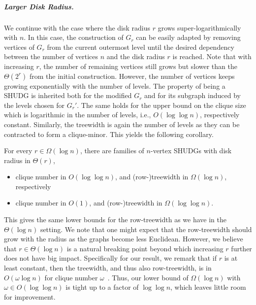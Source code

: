 \documentclass[a4paper,english,cleveref,thm-restate]{lipics-v2021}
\begin{document}
\subparagraph{Larger Disk Radius.}

We continue with the case where the disk radius $r$ grows super-logarithmically with $n$.
In this case, the construction of $G_r$ can be easily adapted by removing vertices of $G_r$ from the current outermost level until the desired dependency between the number of vertices $n$ and the disk radius $r$ is reached.
Note that with increasing $ r $, the number of remaining vertices still grows but slower than the $ \Theta(2^r) $ from the initial construction.
However, the number of vertices keeps growing exponentially with the number of levels.
The property of being a SHUDG is inherited both for the modified $ G_r $ and for its subgraph induced by the levels chosen for $ G_r' $.
The same holds for the upper bound on the clique size which is logarithmic in the number of levels, i.e., $ O(\log \log n) $, respectively constant.
Similarly, the treewidth is again the number of levels as they can be contracted to form a clique-minor.
This yields the following corollary.

\begin{corollary}
    \label{cor:lower-bound-super-log-radius}
    For every $r \in \Omega(\log n)$, there are families of $n$-vertex SHUDGs with disk radius in $\Theta(r)$, 
    \begin{itemize}
        \item clique number in $O(\log\log n)$, and (row-)treewidth in $\Omega(\log n)$, respectively
        \item clique number in $O(1)$, and (row-)treewidth in $\Omega(\log\log n)$.
    \end{itemize}

\end{corollary}

This gives the same lower bounds for the row-treewidth as we have in the $ \Theta(\log n)$ setting.
We note that one might expect that the row-treewidth should grow with the radius as the graphs become less Euclidean.
However, we believe that $r \in \Theta(\log n)$ is a natural breaking point beyond which increasing $r$ further does not have big impact.
Specifically for our result, we remark that if $r $ is at least constant, then the treewidth, and thus also row-treewidth, is in $O(\omega \log n)$ for clique number $ \omega $~\cite{Struc_Indep_Hyper_Unifor_Disk_Graph-Blaesius25,Treew_Graph_Balan_Separ-DvoraNorin19}.
Thus, our lower bound of $\Omega(\log n)$ with $\omega \in O(\log\log n)$ is tight up to a factor of $\log\log n$, which leaves little room for improvement.
\end{document}
